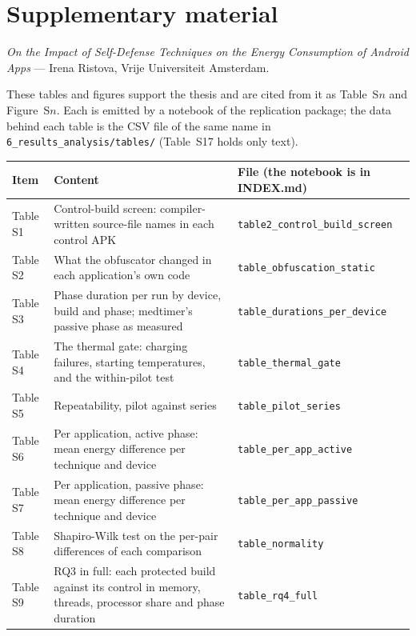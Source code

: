 \documentclass[10pt,a4paper]{article}
\begin{document}
\section*{Supplementary material}
\noindent\emph{On the Impact of Self-Defense Techniques on the Energy Consumption of Android Apps} --- Irena Ristova, Vrije Universiteit Amsterdam.\par\medskip
\noindent These tables and figures support the thesis and are cited from it as Table~S$n$ and Figure~S$n$. Each is emitted by a notebook of the replication package; the data behind each table is the CSV file of the same name in \texttt{6\_results\_analysis/tables/} (Table~S17 holds only text).\par\medskip
\begin{center}\small\begin{tabular}{lp{10cm}l}\toprule \textbf{Item} & \textbf{Content} & \textbf{File (the notebook is in INDEX.md)} \\ \midrule
Table S1 & Control-build screen: compiler-written source-file names in each control APK & \texttt{\footnotesize table2\_control\_build\_screen} \\
Table S2 & What the obfuscator changed in each application's own code & \texttt{\footnotesize table\_obfuscation\_static} \\
Table S3 & Phase duration per run by device, build and phase; medtimer's passive phase as measured & \texttt{\footnotesize table\_durations\_per\_device} \\
Table S4 & The thermal gate: charging failures, starting temperatures, and the within-pilot test & \texttt{\footnotesize table\_thermal\_gate} \\
Table S5 & Repeatability, pilot against series & \texttt{\footnotesize table\_pilot\_series} \\
Table S6 & Per application, active phase: mean energy difference per technique and device & \texttt{\footnotesize table\_per\_app\_active} \\
Table S7 & Per application, passive phase: mean energy difference per technique and device & \texttt{\footnotesize table\_per\_app\_passive} \\
Table S8 & Shapiro-Wilk test on the per-pair differences of each comparison & \texttt{\footnotesize table\_normality} \\
Table S9 & RQ3 in full: each protected build against its control in memory, threads, processor share and phase duration & \texttt{\footnotesize table\_rq4\_full} \\

\end{tabular}
\end{center}
\end{document}
